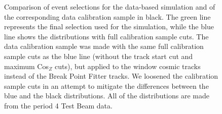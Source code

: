 \documentclass[12pt]{article}
\begin{document}
\begin{figure}[!h]
\vspace*{-6mm}
\caption{Comparison of event selections for the data-based simulation and of the corresponding data calibration sample in black. The green line represents the final selection used for the simulation, while the blue line shows the distributions with full calibration sample cuts. The data calibration sample was made with the same full calibration sample cuts as the blue line (without the track start cut and maximum Cos$_Z$ cuts), but applied to the window cosmic tracks instead of the Break Point Fitter tracks. We loosened the calibration sample cuts in an attempt to mitigate the differences between the blue and the black distributions. All of the distributions are made from the period 4 Test Beam data.}
\label{figPCHitsListCutsComparison}
\end{figure}
\end{document}
